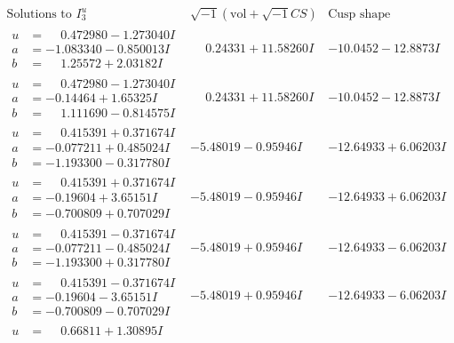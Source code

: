\documentclass[1p]{elsarticle_modified}
\theoremstyle{definition}
\newcommand{\I}{\sqrt{-1}}
\begin{document}
$$\begin{array}{c|c|c}
\text{Solutions to }I^u_{3}& \I (\text{vol} + \sqrt{-1}CS) & \text{Cusp shape}\\
 \hline 
\begin{aligned}
u &= \phantom{-}0.472980 - 1.273040 I \\
a &= -1.083340 - 0.850013 I \\
b &= \phantom{-}1.25572 + 2.03182 I\end{aligned}
 & \phantom{-}0.24331 + 11.58260 I & -10.0452 - 12.8873 I \\ \hline\begin{aligned}
u &= \phantom{-}0.472980 - 1.273040 I \\
a &= -0.14464 + 1.65325 I \\
b &= \phantom{-}1.111690 - 0.814575 I\end{aligned}
 & \phantom{-}0.24331 + 11.58260 I & -10.0452 - 12.8873 I \\ \hline\begin{aligned}
u &= \phantom{-}0.415391 + 0.371674 I \\
a &= -0.077211 + 0.485024 I \\
b &= -1.193300 - 0.317780 I\end{aligned}
 & -5.48019 - 0.95946 I & -12.64933 + 6.06203 I \\ \hline\begin{aligned}
u &= \phantom{-}0.415391 + 0.371674 I \\
a &= -0.19604 + 3.65151 I \\
b &= -0.700809 + 0.707029 I\end{aligned}
 & -5.48019 - 0.95946 I & -12.64933 + 6.06203 I \\ \hline\begin{aligned}
u &= \phantom{-}0.415391 - 0.371674 I \\
a &= -0.077211 - 0.485024 I \\
b &= -1.193300 + 0.317780 I\end{aligned}
 & -5.48019 + 0.95946 I & -12.64933 - 6.06203 I \\ \hline\begin{aligned}
u &= \phantom{-}0.415391 - 0.371674 I \\
a &= -0.19604 - 3.65151 I \\
b &= -0.700809 - 0.707029 I\end{aligned}
 & -5.48019 + 0.95946 I & -12.64933 - 6.06203 I \\ \hline\begin{aligned}
u &= \phantom{-}0.66811 + 1.30895 I \\

\end{aligned}
\end{array}$$
\end{document}
